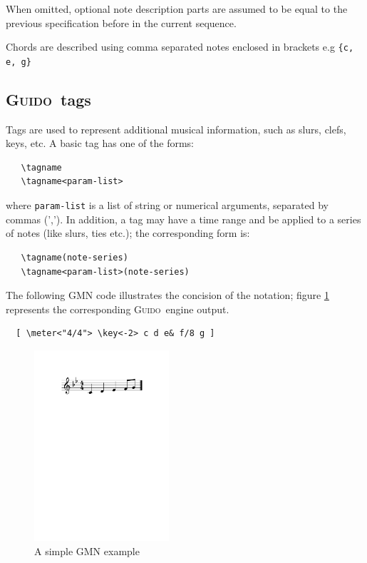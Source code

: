 \documentclass[twoside,10pt,a4paper]{article}
\newenvironment{gmnsyntax}		{\vspace{-2mm}\small}{\vspace{-2mm}}
\newcommand{\Guido}	{\textsc{Guido}}
\newcommand{\code}[1]	{{\small \texttt{#1}}}
\begin{document}
When omitted, optional note description parts are assumed to be equal to the previous specification before in the current sequence.

Chords are described using comma separated notes enclosed in brackets e.g \code{\{c, e, g\}}

\subsection{\Guido\ tags}
Tags are used to represent additional musical information, such as slurs, clefs, keys, etc. A basic tag has one of the forms:
\begin{gmnsyntax} 
\begin{verbatim} 
   \tagname 
   \tagname<param-list>
\end{verbatim} 
\end{gmnsyntax}
\noindent where \code{param-list} is a list of string or numerical arguments, separated by commas (','). In addition, a tag may have a time range and be applied to a series of notes (like slurs, ties etc.); the corresponding form is:
\begin{gmnsyntax} 
\begin{verbatim} 
   \tagname(note-series)
   \tagname<param-list>(note-series)
\end{verbatim} 
\end{gmnsyntax} 

The following GMN code illustrates the concision of the notation; figure \ref{ex1} represents the corresponding \Guido\ engine output. 
\begin{gmnsyntax} 
\begin{verbatim} 
  [ \meter<"4/4"> \key<-2> c d e& f/8 g ]
\end{verbatim}
\end{gmnsyntax} 

\begin{figure}[h]
	\centering \includegraphics[width=50mm]{imgs/ex1}
 \caption{A simple GMN example}
 \label{ex1}
\end{figure}
\end{document}
